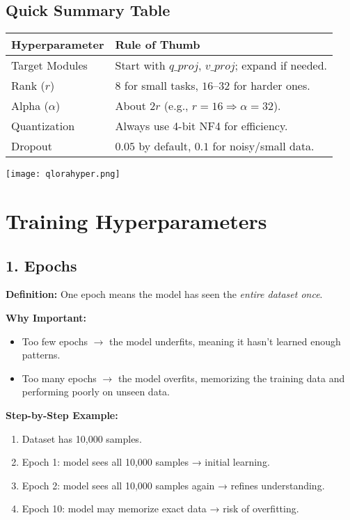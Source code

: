 \documentclass[a4paper, 12pt]{article}
\begin{document}
\subsection*{Quick Summary Table}
\begin{center}
\begin{tabular}{|p{5cm}|p{9cm}|}
\hline
\textbf{Hyperparameter} & \textbf{Rule of Thumb} \\
\hline
Target Modules & Start with $q\_proj$, $v\_proj$; expand if needed. \\
\hline
Rank ($r$) & $8$ for small tasks, $16$–$32$ for harder ones. \\
\hline
Alpha ($\alpha$) & About $2r$ (e.g., $r=16 \Rightarrow \alpha=32$). \\
\hline
Quantization & Always use 4-bit NF4 for efficiency. \\
\hline
Dropout & $0.05$ by default, $0.1$ for noisy/small data. \\
\hline
\end{tabular}
\end{center}

\texttt{[image: qlorahyper.png]}

\newpage


\section*{Training Hyperparameters}

\subsection*{1. Epochs}
\textbf{Definition:} One epoch means the model has seen the \textit{entire dataset once}.  

\textbf{Why Important:} 
\begin{itemize}
    \item Too few epochs $\rightarrow$ the model underfits, meaning it hasn’t learned enough patterns.  
    \item Too many epochs $\rightarrow$ the model overfits, memorizing the training data and performing poorly on unseen data.  
\end{itemize}

\textbf{Step-by-Step Example:}
\begin{enumerate}
    \item Dataset has 10,000 samples.  
    \item Epoch 1: model sees all 10,000 samples → initial learning.  
    \item Epoch 2: model sees all 10,000 samples again → refines understanding.  
    \item Epoch 10: model may memorize exact data → risk of overfitting.  
\end{enumerate}
\end{document}
